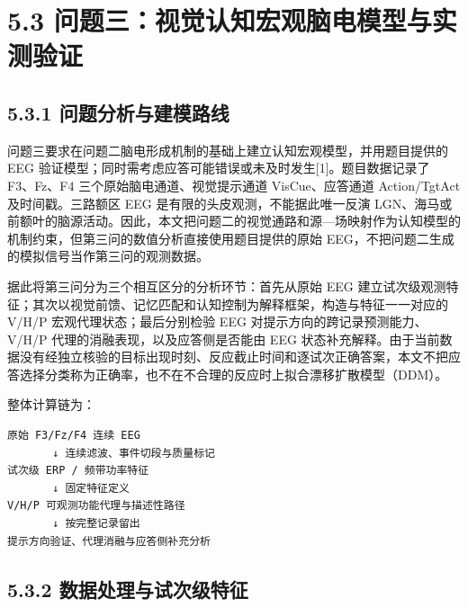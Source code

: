 \hypertarget{ux95eeux9898ux4e09ux89c6ux89c9ux8ba4ux77e5ux5b8fux89c2ux8111ux7535ux6a21ux578bux4e0eux5b9eux6d4bux9a8cux8bc1}{%
\section{5.3
问题三：视觉认知宏观脑电模型与实测验证}\label{ux95eeux9898ux4e09ux89c6ux89c9ux8ba4ux77e5ux5b8fux89c2ux8111ux7535ux6a21ux578bux4e0eux5b9eux6d4bux9a8cux8bc1}}

\hypertarget{ux95eeux9898ux5206ux6790ux4e0eux5efaux6a21ux8defux7ebf}{%
\subsection{5.3.1
问题分析与建模路线}\label{ux95eeux9898ux5206ux6790ux4e0eux5efaux6a21ux8defux7ebf}}

问题三要求在问题二脑电形成机制的基础上建立认知宏观模型，并用题目提供的
EEG 验证模型；同时需考虑应答可能错误或未及时发生{[}1{]}。题目数据记录了
F3、Fz、F4 三个原始脑电通道、视觉提示通道 VisCue、应答通道 Action/TgtAct
及时间戳。三路额区 EEG 是有限的头皮观测，不能据此唯一反演
LGN、海马或前额叶的脑源活动。因此，本文把问题二的视觉通路和源---场映射作为认知模型的机制约束，但第三问的数值分析直接使用题目提供的原始
EEG，不把问题二生成的模拟信号当作第三问的观测数据。

据此将第三问分为三个相互区分的分析环节：首先从原始 EEG
建立试次级观测特征；其次以视觉前馈、记忆匹配和认知控制为解释框架，构造与特征一一对应的
V/H/P 宏观代理状态；最后分别检验 EEG 对提示方向的跨记录预测能力、V/H/P
代理的消融表现，以及应答侧是否能由 EEG
状态补充解释。由于当前数据没有经独立核验的目标出现时刻、反应截止时间和逐试次正确答案，本文不把应答选择分类称为正确率，也不在不合理的反应时上拟合漂移扩散模型（DDM）。

整体计算链为：

\begin{verbatim}
原始 F3/Fz/F4 连续 EEG
       ↓ 连续滤波、事件切段与质量标记
试次级 ERP / 频带功率特征
       ↓ 固定特征定义
V/H/P 可观测功能代理与描述性路径
       ↓ 按完整记录留出
提示方向验证、代理消融与应答侧补充分析
\end{verbatim}

\hypertarget{ux6570ux636eux5904ux7406ux4e0eux8bd5ux6b21ux7ea7ux7279ux5f81}{%
\subsection{5.3.2
数据处理与试次级特征}\label{ux6570ux636eux5904ux7406ux4e0eux8bd5ux6b21ux7ea7ux7279ux5f81}}

